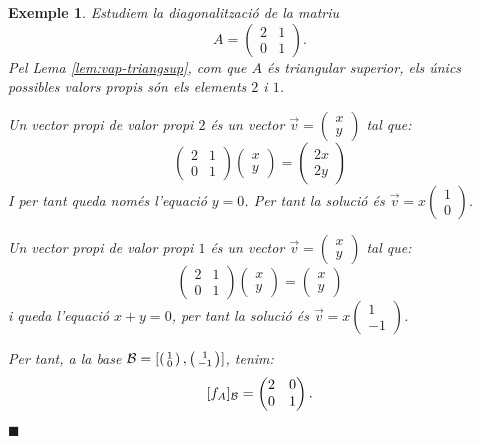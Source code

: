 \documentclass[
  11pt,
]{book}
\numberwithin{dummy}{section}
\theoremstyle{maincolornumbox}
\theoremstyle{blacknumex}
\newtheorem{exampleT}{Exemple}[chapter]
\theoremstyle{blacknumbox}
\theoremstyle{maincolornum}
\newenvironment{example}{\begin{exampleT}}{\hfill{\tiny\ensuremath{\blacksquare}}\end{exampleT}}
\begin{document}
\begin{example}
\protect\hypertarget{exm:mat2101}{}\label{exm:mat2101}Estudiem la diagonalització de la
matriu \[A=\begin{pmatrix}
2 &  1 \\ 0 & 1
\end{pmatrix}.\] Pel Lema
\ref{lem:vap-triangsup}, com que \(A\) és triangular superior, els
únics possibles valors propis són els elements \(2\) i \(1\).

Un vector propi de valor propi \(2\) és un vector
\(\vec v=\left(\begin{smallmatrix} x \\ y \end{smallmatrix}\right)\) tal
que: \[\begin{pmatrix}
2 &  1 \\ 0 & 1
\end{pmatrix}
\begin{pmatrix} x \\ y \end{pmatrix} =
\begin{pmatrix} 2x \\ 2y \end{pmatrix}\] I per tant queda només
l'equació \(y = 0\). Per tant la solució és
\(\vec v= x\left(\begin{smallmatrix} 1 \\ 0 \end{smallmatrix}\right)\).

Un vector propi de valor propi \(1\) és un vector
\(\vec v=\left(\begin{smallmatrix} x \\ y \end{smallmatrix}\right)\) tal
que: \[\begin{pmatrix}
2 &  1 \\ 0 & 1
\end{pmatrix}
\begin{pmatrix} x \\ y \end{pmatrix} =
\begin{pmatrix} x \\ y \end{pmatrix}\] i queda l'equació \(x+y=0\), per
tant la solució és
\(\vec v=x\left(\begin{smallmatrix} 1 \\ -1 \end{smallmatrix}\right)\).

Per tant, a la base
\(\mathcal{B}=[\left(\begin{smallmatrix} 1 \\ 0 \end{smallmatrix}\right),\left(\begin{smallmatrix} 1 \\ -1 \end{smallmatrix}\right)]\),
tenim: \[[f_A]_{\mathcal{B}}=\begin{pmatrix}
2 & 0 \\ 0 & 1
\end{pmatrix}.\]
\end{example}
\end{document}
